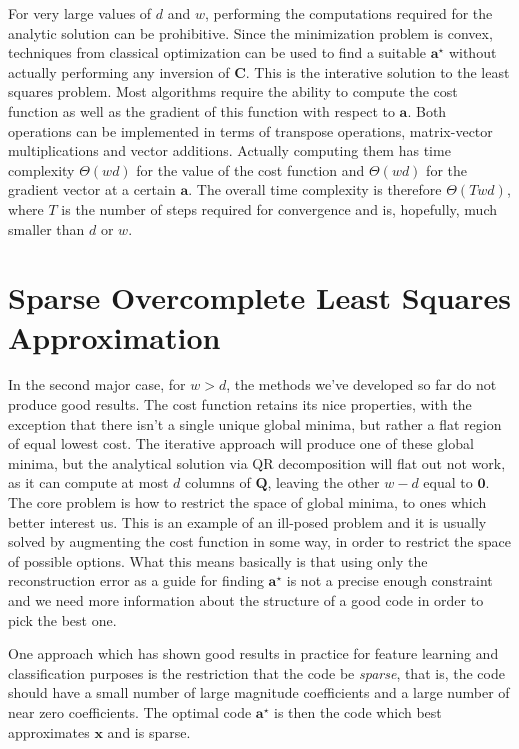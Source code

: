 \documentclass[12pt,a4paper,oneside,english]{UPBThesis}
\begin{document}
For very large values of $d$ and $w$, performing the computations required for the analytic solution can be prohibitive. Since the minimization problem is convex, techniques from classical optimization can be used to find a suitable $\textbf{a}^\star$ without actually performing any inversion of $\textbf{C}$. This is the interative solution to the least squares problem. Most algorithms require the ability to compute the cost function as well as the gradient of this function with respect to $\textbf{a}$. Both operations can be implemented in terms of transpose operations, matrix-vector multiplications and vector additions. Actually computing them has time complexity $\Theta(wd)$ for the value of the cost function and $\Theta(wd)$ for the gradient vector at a certain $\textbf{a}$. The overall time complexity is therefore $\Theta(Twd)$, where $T$ is the number of steps required for convergence and is, hopefully, much smaller than $d$ or $w$.

\section{Sparse Overcomplete Least Squares Approximation}
\label{sec:SparseOvercompleteLeastSquaresApproximation}

In the second major case, for $w > d$, the methods we've developed so far do not produce good results. The cost function retains its nice properties, with the exception that there isn't a single unique global minima, but rather a flat region of equal lowest cost. The iterative approach will produce one of these global minima, but the analytical solution via QR decomposition will flat out not work, as it can compute at most $d$ columns of $\textbf{Q}$, leaving the other $w - d$ equal to $\textbf{0}$. The core problem is how to restrict the space of global minima, to ones which better interest us. This is an example of an ill-posed problem and it is usually solved by augmenting the cost function in some way, in order to restrict the space of possible options. What this means basically is that using only the reconstruction error as a guide for finding $\textbf{a}^\star$ is not a precise enough constraint and we need more information about the structure of a good code in order to pick the best one.

One approach which has shown good results in practice for feature learning \cite{emergence-sparse-coding,sparse-coding-strategy-V1} and classification purposes \cite{sparse-features-audio-classification,importance-encoding-sparse-coding-vq,simple-method-sparse-coding} is the restriction that the code be \emph{sparse}, that is, the code should have a small number of large magnitude coefficients and a large number of near zero coefficients. The optimal code $\textbf{a}^\star$ is then the code which best approximates $\textbf{x}$ and is sparse.
\end{document}
